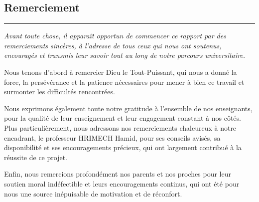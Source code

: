 \documentclass[12pt]{report}
\begin{document}

\begin{center}
\section*{Remerciement}
\end{center}

\begin{center}
  \par\nobreak\vspace{\baselineskip}
  \noindent\rule{12cm}{0.2pt}
  \par\nobreak\vspace{\baselineskip}
\end{center}

{\Large\itshape
Avant toute chose, il apparaît opportun de commencer ce rapport par des remerciements sincères, à l’adresse de tous ceux qui nous ont soutenus, encouragés et transmis leur savoir tout au long de notre parcours universitaire.

\par\bigskip

Nous tenons d’abord à remercier Dieu le Tout-Puissant, qui nous a donné la force, la persévérance et la patience nécessaires pour mener à bien ce travail et surmonter les difficultés rencontrées.

\par\bigskip

Nous exprimons également toute notre gratitude à l’ensemble de nos enseignants, pour la qualité de leur enseignement et leur engagement constant à nos côtés. Plus particulièrement, nous adressons nos remerciements chaleureux à notre encadrant, le professeur HRIMECH Hamid, pour ses conseils avisés, sa disponibilité et ses encouragements précieux, qui ont largement contribué à la réussite de ce projet.

\par\bigskip

Enfin, nous remercions profondément nos parents et nos proches pour leur soutien moral indéfectible et leurs encouragements continus, qui ont été pour nous une source inépuisable de motivation et de réconfort.

\par\bigskip
}
\end{document}
